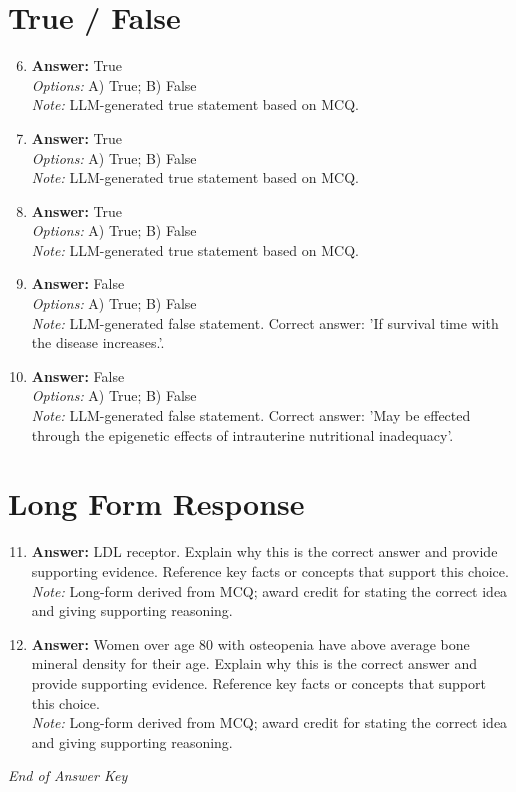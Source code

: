 \documentclass[12pt]{article}
\begin{document}
\section*{True / False}
\begin{enumerate}[label=\arabic*.]
\setcounter{enumi}{5}
\item \textbf{Answer:} True
\\ \textit{Options:} A) True; B) False
\\ \textit{Note:} LLM-generated true statement based on MCQ.
\item \textbf{Answer:} True
\\ \textit{Options:} A) True; B) False
\\ \textit{Note:} LLM-generated true statement based on MCQ.
\item \textbf{Answer:} True
\\ \textit{Options:} A) True; B) False
\\ \textit{Note:} LLM-generated true statement based on MCQ.
\item \textbf{Answer:} False
\\ \textit{Options:} A) True; B) False
\\ \textit{Note:} LLM-generated false statement. Correct answer: 'If survival time with the disease increases.'.
\item \textbf{Answer:} False
\\ \textit{Options:} A) True; B) False
\\ \textit{Note:} LLM-generated false statement. Correct answer: 'May be effected through the epigenetic effects of intrauterine nutritional inadequacy'.
\end{enumerate}

\section*{Long Form Response}
\begin{enumerate}[label=\arabic*.]
\setcounter{enumi}{10}
\item \textbf{Answer:} LDL receptor. Explain why this is the correct answer and provide supporting evidence. Reference key facts or concepts that support this choice.
\\ \textit{Note:} Long-form derived from MCQ; award credit for stating the correct idea and giving supporting reasoning.
\item \textbf{Answer:} Women over age 80 with osteopenia have above average bone mineral density for their age. Explain why this is the correct answer and provide supporting evidence. Reference key facts or concepts that support this choice.
\\ \textit{Note:} Long-form derived from MCQ; award credit for stating the correct idea and giving supporting reasoning.
\end{enumerate}

\vfill
\noindent\textit{End of Answer Key}
\end{document}
